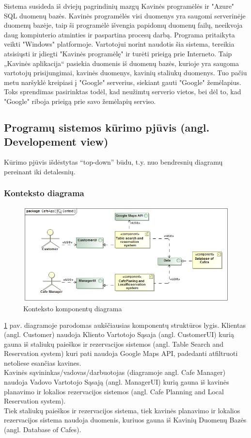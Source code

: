 \documentclass{VUMIFPSkursinis}
\begin{document}
Sistema susideda iš dviejų pagrindinių mazgų Kavinės programėlės ir "Azure" SQL duomenų bazės. Kavinės programėlės visi duomenys yra saugomi serverinėje duomenų bazėje, taip ši programėlė išvengia papidomų duomenų failų, neeikvoja daug kompiuterio atminties ir paspartina procesų darbą. Programa pritaikyta veikti "Windows" platformoje. Vartotojui norint naudotis šia sistema, tereikia atsisiųsti ir įdiegti "Kavinės programėlę" ir turėti prieigą prie Interneto. Taip „Kavinės aplikacija“ pasiekia duomenis iš duomenų bazės, kurioje yra saugoma vartotojų prisijungimai, kavinės duomenys, kavinių staliukų duomenys. Tuo pačiu metu naršyklė kreipiasi į "Google" serverius, siekiant gauti "Google" žemėlapius. Toks sprendimas pasirinktas todėl, kad neužimtų serverio vietos, bei dėl to, kad "Google" riboja prieigą prie savo žemėlapių serviso. 




\subsection {Programų sistemos kūrimo pjūvis (angl. Developement view)}
Kūrimo pjūvis išdėstytas “top-down” būdu, t.y. nuo bendresnių
diagramų pereinant iki detalesnių.

\subsubsection{Konteksto diagrama}

\begin {figure}[H]
	\includegraphics[width=\textwidth,height=\textheight,keepaspectratio]{img/Context}
	\caption{Konteksto komponentų diagrama}
	\label{fig:Context}
\end{figure}

\ref {fig:Context} pav. diagramoje parodomas aukščiausias komponentų struktūros lygis. Klientas (angl. Customer) naudoja Kliento Vartotojo Sąsaja (angl. CustomerUI) kurią gauna iš staliukų paieškos ir rezervacijos sistemos (angl. Table Search and Reservation system) kuri pati naudoja Google Maps API, padedanti atfiltruoti netoliese esančias kavines. \\
Kavinės sąvininkas/vadovas/darbuotojas (diagramoje angl. Cafe Manager) naudoja Vadovo Vartotojo Sąsają (angl. ManagerUI) kurią gauna iš kavinės planavimo ir lokalios rezervacijos sistemos (angl. Cafe Planning and Local Reservation system).\\
Tiek staliukų paieškos ir rezervacijos sistema, tiek kavinės planavimo ir lokalios rezervacijos sistema naudoja duomenis, kuriuos gauna iš Kavinių Duomenų Bazės (angl. Database of Cafes).
\end{document}
